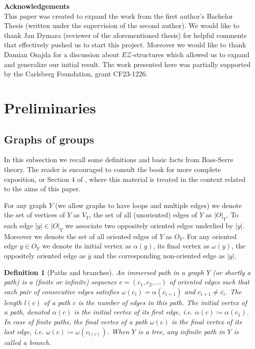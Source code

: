 \documentclass[12pt, a4paper]{article}
\newcommand{\8}{\infty}
\newcommand{\abs}[1]{\left| #1 \right|}
\theoremstyle{break}
\theoremstyle{defbreak}
\newtheorem{df}[thm]{Definition}
\newcommand{\ol}[1]{\overline{#1}}
\begin{document}
\textbf{Acknowledgements}\\
This paper was created to expand the work from the first author's Bachelor Thesis (written under the supervision of the second author). We would like to thank Jan Dymara (reviewer of the aforementioned thesis) for helpful comments that effectively pushed us to start this project. Moreover we would like to thank Damian Osajda for a discussion about $E\mathcal{Z}$-structures which allowed us to expand and generalize our initial result. The work presented here was partially supported by the Carlsberg Foundation, grant CF23-1226.

\section{Preliminaries} \label{Section:Preliminaries}


\subsection{Graphs of groups}\label{Subsection:graphs_of_groups}

In this subsection we recall some definitions and basic facts from Bass-Serre theory. The reader is encouraged to consult the book \cite{serre-trees} for more complete exposition, or Section $4$ of \cite{dense-amalgam}, where this material is treated in the context related to the  aims of this paper.

For any graph $Y$ (we allow graphs to have loops and multiple edges) we denote the set of vertices of $Y$ as $V_Y$, the set of all (unoriented) edges of $Y$ as $\abs{O}_Y$. To each edge $\abs{y}\in \abs{O}_Y$ we associate two oppositely oriented edges underlied by $\abs{y}$. Moreover we denote the set of all oriented edges of $Y$ as $O_Y$. For any oriented edge $y\in O_Y$ we denote its initial vertex as $\alpha(y)$, its final vertex as $\omega(y)$, the oppositely oriented edge as $\ol{y}$ and the corresponding non-oriented edge as $\abs{y}$.\medskip

\begin{df}[Paths and branches]
    An \textit{immersed path} in a graph $Y$ (or shortly a \textit{path}) is a (finite or infinite) sequence $c=(c_1,c_2,\dots)$ of oriented edges such that each pair of consecutive edges satisfies $\omega(c_i) = \alpha(c_{i+1})$ and $c_{i+1}\ne\ol{c_i}$. The \textit{length} $l(c)$ of a path $c$ is the number of edges in this path. The \textit{initial} vertex of a path, denoted $\alpha(c)$ is the initial vertex of its first edge, i.e. $\alpha(c)\coloneqq\alpha(c_1)$. In case of finite paths, the \textit{final} vertex of a path $\omega(c)$ is the final vertex of its last edge, i.e. $\omega(c)\coloneqq\omega(c_{l(c)})$. When $Y$ is a tree, any infinite path in $Y$ is called a \textit{branch}.
\end{df}
\end{document}
